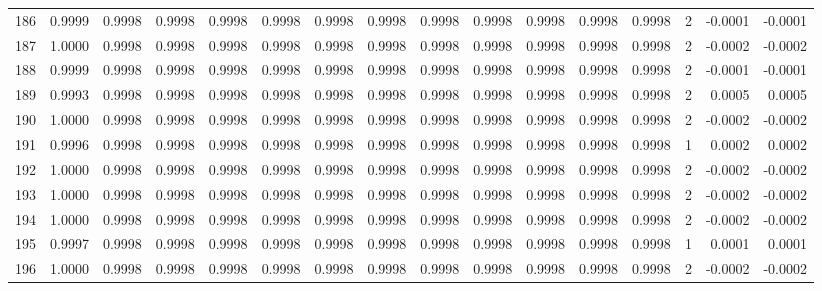 \begin{tabular}{lrrrrrrrrrrrrrrr}
186 &      0.9999 &  0.9998 &  0.9998 &  0.9998 &  0.9998 &  0.9998 &  0.9998 &  0.9998 &  0.9998 &  0.9998 &   0.9998 &     0.9998 &      2 &                   -0.0001 &                    -0.0001 \\
187 &      1.0000 &  0.9998 &  0.9998 &  0.9998 &  0.9998 &  0.9998 &  0.9998 &  0.9998 &  0.9998 &  0.9998 &   0.9998 &     0.9998 &      2 &                   -0.0002 &                    -0.0002 \\
188 &      0.9999 &  0.9998 &  0.9998 &  0.9998 &  0.9998 &  0.9998 &  0.9998 &  0.9998 &  0.9998 &  0.9998 &   0.9998 &     0.9998 &      2 &                   -0.0001 &                    -0.0001 \\
189 &      0.9993 &  0.9998 &  0.9998 &  0.9998 &  0.9998 &  0.9998 &  0.9998 &  0.9998 &  0.9998 &  0.9998 &   0.9998 &     0.9998 &      2 &                    0.0005 &                     0.0005 \\
190 &      1.0000 &  0.9998 &  0.9998 &  0.9998 &  0.9998 &  0.9998 &  0.9998 &  0.9998 &  0.9998 &  0.9998 &   0.9998 &     0.9998 &      2 &                   -0.0002 &                    -0.0002 \\
191 &      0.9996 &  0.9998 &  0.9998 &  0.9998 &  0.9998 &  0.9998 &  0.9998 &  0.9998 &  0.9998 &  0.9998 &   0.9998 &     0.9998 &      1 &                    0.0002 &                     0.0002 \\
192 &      1.0000 &  0.9998 &  0.9998 &  0.9998 &  0.9998 &  0.9998 &  0.9998 &  0.9998 &  0.9998 &  0.9998 &   0.9998 &     0.9998 &      2 &                   -0.0002 &                    -0.0002 \\
193 &      1.0000 &  0.9998 &  0.9998 &  0.9998 &  0.9998 &  0.9998 &  0.9998 &  0.9998 &  0.9998 &  0.9998 &   0.9998 &     0.9998 &      2 &                   -0.0002 &                    -0.0002 \\
194 &      1.0000 &  0.9998 &  0.9998 &  0.9998 &  0.9998 &  0.9998 &  0.9998 &  0.9998 &  0.9998 &  0.9998 &   0.9998 &     0.9998 &      2 &                   -0.0002 &                    -0.0002 \\
195 &      0.9997 &  0.9998 &  0.9998 &  0.9998 &  0.9998 &  0.9998 &  0.9998 &  0.9998 &  0.9998 &  0.9998 &   0.9998 &     0.9998 &      1 &                    0.0001 &                     0.0001 \\
196 &      1.0000 &  0.9998 &  0.9998 &  0.9998 &  0.9998 &  0.9998 &  0.9998 &  0.9998 &  0.9998 &  0.9998 &   0.9998 &     0.9998 &      2 &                   -0.0002 &                    -0.0002 \\

\end{tabular}
